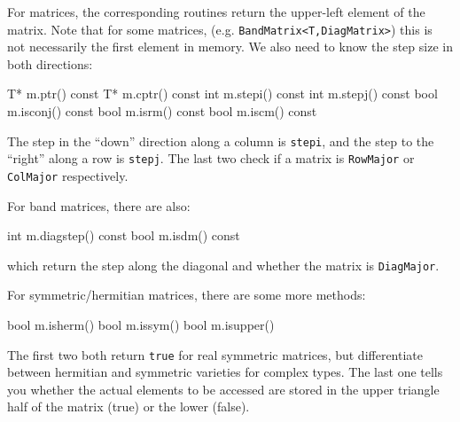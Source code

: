 \documentclass[twoside,letterpaper,11pt]{article}
\renewcommand{\tt}[1]{{\lstinline {#1}}}
\begin{document}
For matrices, the corresponding routines return the upper-left element
of the matrix.  Note that for some matrices, (e.g. \tt{BandMatrix<T,DiagMatrix>}) 
this is not necessarily the first element in memory.  We also need to know the 
step size in both directions:
\begin{tmvcode}
T* m.ptr()
const T* m.cptr() const
int m.stepi() const
int m.stepj() const
bool m.isconj() const
bool m.isrm() const
bool m.iscm() const
\end{tmvcode}
The step in the ``down'' direction along a column is \tt{stepi}, and the step to 
the ``right'' along a row is \tt{stepj}.
The last two check if a matrix is \tt{RowMajor} or \tt{ColMajor} respectively.

For band matrices, there are also:
\begin{tmvcode}
int m.diagstep() const
bool m.isdm() const
\end{tmvcode}
which return the step along the diagonal and whether the matrix is \tt{DiagMajor}.

For symmetric/hermitian matrices, there are some more methods:
\begin{tmvcode}
bool m.isherm()
bool m.issym()
bool m.isupper()
\end{tmvcode}
The first two both return \tt{true} for real symmetric matrices, but 
differentiate between hermitian and symmetric varieties for complex types.
The last one tells you whether the actual elements to be accessed are stored
in the upper triangle half of the matrix (true) or the lower (false).
\end{document}
